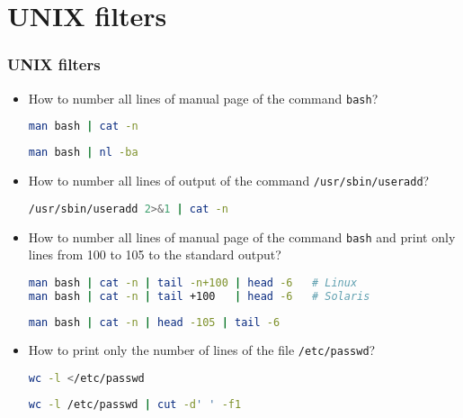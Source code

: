\section{UNIX filters} 
\begin{frame}[fragile]
\frametitle{UNIX filters}
	\begin{itemize}
	
		\item How to number all lines of manual page of the command \texttt{bash}?
		
		\begin{footnotesize}
\begin{lstlisting}[language=bash]		
man bash | cat -n
\end{lstlisting}
\begin{lstlisting}[language=bash]		
man bash | nl -ba
\end{lstlisting}
		\end{footnotesize}
 	
		\item How to number all lines of output of the command \texttt{/usr/sbin/useradd}?
		
		\begin{footnotesize}
\begin{lstlisting}[language=bash]		
/usr/sbin/useradd 2>&1 | cat -n
\end{lstlisting}
		\end{footnotesize}

		\item  How to number all lines of manual page of the command \texttt{bash} and 
			print only lines from 100 to 105 to the standard output?

		\begin{footnotesize}
\begin{lstlisting}[language=bash]		
man bash | cat -n | tail -n+100 | head -6   # Linux
man bash | cat -n | tail +100   | head -6   # Solaris
\end{lstlisting}

\begin{lstlisting}[language=bash]
man bash | cat -n | head -105 | tail -6
\end{lstlisting}

		\end{footnotesize}

		\item How to print only the number of lines of the file \texttt{/etc/passwd}?
			
		\begin{footnotesize}
\begin{lstlisting}[language=bash]		
wc -l </etc/passwd
\end{lstlisting}
\begin{lstlisting}[language=bash]		
wc -l /etc/passwd | cut -d' ' -f1
\end{lstlisting}
		\end{footnotesize}
		
	\end{itemize}
\end{frame}

